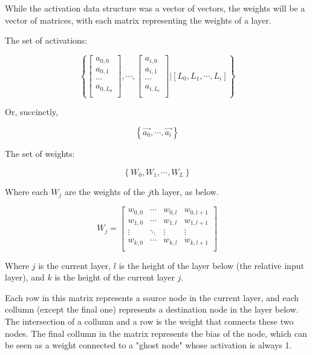 \documentclass[8pt]{amsart}
\begin{document}
While the activation data structure was a vector of vectors, the weights will be
a vector of matrices, with each matrix representing the weights of a layer.

The set of activations:

\[
\left\{
    \begin{bmatrix}
        a_{0, 0} \\
        a_{0, 1} \\
        \cdots{} \\
        a_{0, L_0} \\
    \end{bmatrix},
    \cdots{},
    \begin{bmatrix}
        a_{i, 0} \\
        a_{i, 1} \\
        \cdots{} \\
        a_{i, L_i} \\
    \end{bmatrix} \vert
    \left[ L_0, L_1, \cdots{}, L_i \right]
\right\}
\]

Or, succinctly,

\[
\left\{
    \vec{a_0},
    \cdots,
    \vec{a_i}
\right\}
\]

The set of weights:

\[
\left\{
    W_0, W_1, \cdots, W_L
\right\}
\]

Where each $W_j$ are the weights of the $j$th layer, as below.

\[
    W_j =
    \begin{bmatrix}
        w_{0, 0} & \cdots & w_{0, l} & w_{0, l + 1} \\
        w_{1, 0} & \cdots & w_{1, l} & w_{1, l + 1} \\
        \vdots   & \ddots & \vdots   & \vdots       \\
        w_{k, 0} & \cdots & w_{k, l} & w_{k, l + 1} \\
    \end{bmatrix}
\]

Where $j$ is the current layer, $l$ is the height of the layer below (the relative
input layer), and $k$ is the height of the current layer $j$.

Each row in this matrix represents a source node in the current layer, and each
collumn (except the final one) represents a destination node in the layer below.
The intersection of a collumn and a row is the weight that connects these two nodes.
The final collumn in the matrix represents the bias of the node, which can be seen
as a weight connected to a "ghost node" whose activation is always 1.
\end{document}
